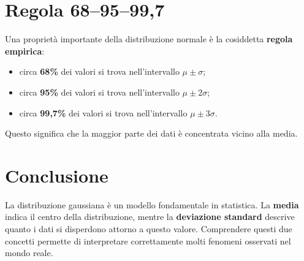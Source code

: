 \documentclass[12pt, a4paper]{article}
\begin{document}
\section{Regola 68–95–99{,}7}

Una proprietà importante della distribuzione normale è la cosiddetta \textbf{regola empirica}:

\begin{itemize}
  \item circa \textbf{68\%} dei valori si trova nell'intervallo $\mu \pm \sigma$;
  \item circa \textbf{95\%} dei valori si trova nell'intervallo $\mu \pm 2\sigma$;
  \item circa \textbf{99{,}7\%} dei valori si trova nell'intervallo $\mu \pm 3\sigma$.
\end{itemize}

\begin{center}
\end{center}

Questo significa che la maggior parte dei dati è concentrata vicino alla media.

\section{Conclusione}

La distribuzione gaussiana è un modello fondamentale in statistica. La \textbf{media} indica il centro della distribuzione, mentre la \textbf{deviazione standard} descrive quanto i dati si disperdono attorno a questo valore. Comprendere questi due concetti permette di interpretare correttamente molti fenomeni osservati nel mondo reale.
\end{document}
